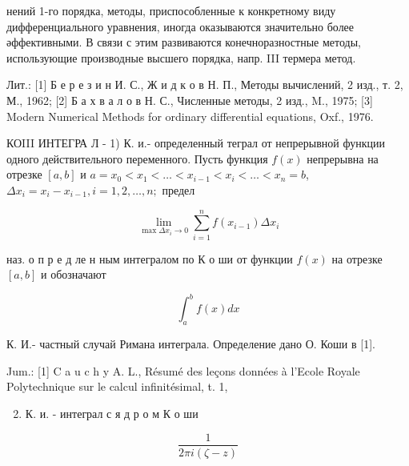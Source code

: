 \documentclass[10pt]{article}
\begin{document}
нений 1-го порядка, методы, приспособленные к конкретному виду дифференциального уравнения, иногда оказываются значительно более әффективными. В связи с этим развиваются конечноразностные методы, использующие производные высшего порядка, напр. III термера метод.



Лит.: [1] Б е р е з и н И. С., Ж и д к о в Н. П., Методы вычислений, 2 изд., т. 2, М., 1962; [2] Б а х в а л о в Н. С., Численные методы, 2 изд., M., 1975; [3] Modern Numerical Methods for ordinary differential equations, Oxf., 1976.



КОIII ИНТЕГРА Л - 1) К. и.- определенный теграл от непрерывной функции одного действительного переменного. Пусть функция $f(x)$ непрерывна на отрезке $[a, b]$ и $a=x_{0}<x_{1}<\ldots<x_{i-1}<x_{i}<\ldots<x_{n}=b$, $\Delta x_{i}=x_{i}-x_{i-1}, i=1,2, \ldots, n ;$ предел



\[

\lim _{\max \Delta x_{i} \rightarrow 0} \sum_{i=1}^{n} f\left(x_{i-1}\right) \Delta x_{i}

\]



наз. о п р е д ле н ным интегралом по К о ши от функции $f(x)$ на отрезке $[a, b]$ и обозначают



\[

\int_{a}^{b} f(x) d x

\]



К. И.- частный случай Римана интеграла. Определение дано О. Коши в [1].



Jum.: [1] C a u c h y A. L., Résumé des leçons données à l'Ecole Royale Polytechnique sur le calcul infinitésimal, t. 1,



\begin{enumerate}

  \setcounter{enumi}{1}

  \item К. и. - интеграл с я д р о м К о ши

\end{enumerate}



\[

\frac{1}{2 \pi i(\zeta-z)}

\]
\end{document}
